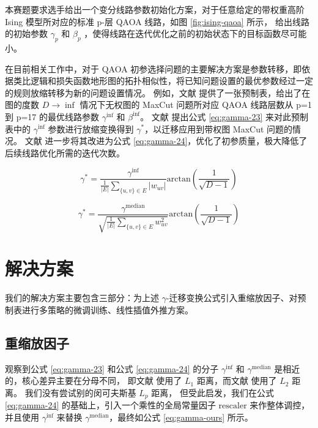 \documentclass[withoutpreface,bwprint]{cumcmthesis}
\begin{document}
本赛题要求选手给出一个变分线路参数初始化方案，对于任意给定的带权重高阶 Ising 模型所对应的标准 p-层 QAOA 线路，如图 \ref{fig:ising-qaoa} 所示，
给出线路的初始参数 $ \gamma_p $ 和 $ \beta_p $ ，使得线路在迭代优化之前的初始状态下的目标函数尽可能小。

在目前相关工作中，对于 QAOA 初参选择问题的主要解决方案是参数转移，即依据类比逻辑和损失函数地形图的拓扑相似性，将已知问题设置的最优参数经过一定的规则放缩转移为新的问题设置情况。
例如，文献 \cite{Basso2022} 提供了一张预制表，给出了在图的度数 $ D \rightarrow \inf $ 情况下无权图的 MaxCut 问题所对应 QAOA 线路层数从 p=1 到 p=17 的最优线路参数 $ \gamma^\mathrm{inf} $ 和 $ \beta^\mathrm{inf} $。
文献 \cite{Shaydulin2023} 提出公式 \ref{eq:gamma-23} 来对此预制表中的 $ \gamma^\mathrm{inf} $ 参数进行放缩变换得到 $ \gamma^\ast $，以迁移应用到带权图 MaxCut 问题的情况。
文献 \cite{Sureshbabu2024} 进一步将其改进为公式 \ref{eq:gamma-24}，优化了初参质量，极大降低了后续线路优化所需的迭代次数。

\begin{equation}
\gamma^\ast = \frac{\gamma^{\mathrm{inf}}}{\frac{1}{|E|} \sum_{\{u,v\} \in E} |w_{uv}|} \mathrm{arctan}(\frac{1}{\sqrt{D-1}})
\label{eq:gamma-23}
\end{equation}

\begin{equation}
\gamma^\ast = \frac{\gamma^{\mathrm{median}}}{\sqrt{\frac{1}{|E|} \sum_{\{u,v\} \in E} w_{uv}^2}} \mathrm{arctan}(\frac{1}{\sqrt{D-1}})
\label{eq:gamma-24}
\end{equation}


\section{解决方案}

我们的解决方案主要包含三部分：为上述 $ \gamma $-迁移变换公式引入重缩放因子、对预制表进行多策略的微调训练、线性插值外推方案。

\subsection{重缩放因子}

观察到公式 \ref{eq:gamma-23} 和公式 \ref{eq:gamma-24} 的分子 $ \gamma^\mathrm{inf} $ 和 $ \gamma^\mathrm{median} $ 是相近的，核心差异主要在分母不同，
即文献 \cite{Shaydulin2023} 使用了 $ L_1 $ 距离，而文献 \cite{Sureshbabu2024} 使用了 $ L_2 $ 距离。
我们没有尝试别的闵可夫斯基 $ L_p $ 距离， 但受此启发，我们在公式 \ref{eq:gamma-24} 的基础上，引入一个乘性的全局常量因子 $ \mathrm{rescaler} $ 来作整体调控，
并且使用 $ \gamma^\mathrm{inf} $ 来替换 $ \gamma^\mathrm{median} $，最终如公式 \ref{eq:gamma-ours} 所示。
\end{document}
